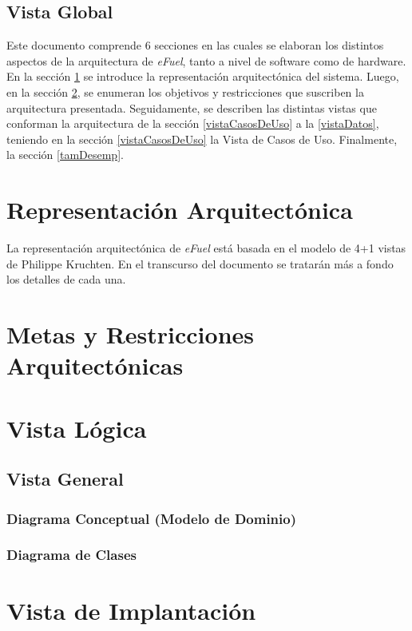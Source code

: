 \documentclass{article}
\begin{document}
    \subsection{Vista Global}
    Este documento comprende 6 secciones en las cuales se elaboran los distintos aspectos de la arquitectura de \emph{eFuel}, tanto a nivel de software como de hardware. En la sección \ref{reprArq} se introduce la representación arquitectónica del sistema. Luego, en la sección \ref{metasArq}, se enumeran los objetivos y restricciones que suscriben la arquitectura presentada. Seguidamente, se describen las distintas vistas que conforman la arquitectura de la sección \ref{vistaCasosDeUso} a la \ref{vistaDatos}, teniendo en la sección \ref{vistaCasosDeUso} la Vista de Casos de Uso. Finalmente, la sección \ref{tamDesemp}.


    \section{Representación Arquitectónica} \label{reprArq}
    La representación arquitectónica de \emph{eFuel} está basada en el modelo de 4+1 vistas de Philippe Kruchten. En el transcurso del documento se tratarán más a fondo los detalles de cada una.

    \section{Metas y Restricciones Arquitectónicas} \label{metasArq}


    

    \section{Vista Lógica} \label{vistaLogica}
    \subsection{Vista General}
    \subsubsection{Diagrama Conceptual (Modelo de Dominio)}
    \subsubsection{Diagrama de Clases}

    \section{Vista de Implantación} \label{vistaImplantacion}
\end{document}
